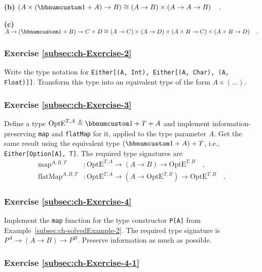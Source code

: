 \textbf{(b)} $\left(A\times(\bbnum 1+A)\rightarrow B\right)\cong\left(A\rightarrow B\right)\times\left(A\rightarrow A\rightarrow B\right)\quad.$

\textbf{(c)} $A\rightarrow\left(\bbnum 1+B\right)\rightarrow C\times D\cong\left(A\rightarrow C\right)\times\left(A\rightarrow D\right)\times\left(A\times B\rightarrow C\right)\times\left(A\times B\rightarrow D\right)\quad.$

\subsubsection{Exercise \label{subsec:ch-Exercise-2}\ref{subsec:ch-Exercise-2}}

Write the type notation for \lstinline!Either[(A, Int), Either[(A, Char), (A, Float)]]!.
Transform this type into an equivalent type of the form $A\times(...)$.

\subsubsection{Exercise \label{subsec:ch-Exercise-3}\ref{subsec:ch-Exercise-3}}

Define a type $\text{OptE}^{T,A}\triangleq\bbnum 1+T+A$ and implement
information-preserving \lstinline!map! and \lstinline!flatMap! for
it, applied to the type parameter $A$. Get the same result using
the equivalent type $(\bbnum 1+A)+T$, i.e., \lstinline!Either[Option[A], T]!.
The required type signatures are
\begin{align*}
\text{map}^{A,B,T} & :\text{OptE}^{T,A}\rightarrow\left(A\rightarrow B\right)\rightarrow\text{OptE}^{T,B}\quad,\\
\text{flatMap}^{A,B,T} & :\text{OptE}^{T,A}\rightarrow(A\rightarrow\text{OptE}^{T,B})\rightarrow\text{OptE}^{T,B}\quad.
\end{align*}


\subsubsection{Exercise \label{subsec:ch-Exercise-4}\ref{subsec:ch-Exercise-4}}

Implement the \lstinline!map! function for the type constructor \lstinline!P[A]!
from Example~\ref{subsec:ch-solvedExample-2}. The required type
signature is $P^{A}\rightarrow\left(A\rightarrow B\right)\rightarrow P^{B}$.
Preserve information as much as possible.

\subsubsection{Exercise \label{subsec:ch-Exercise-4-1}\ref{subsec:ch-Exercise-4-1}}

